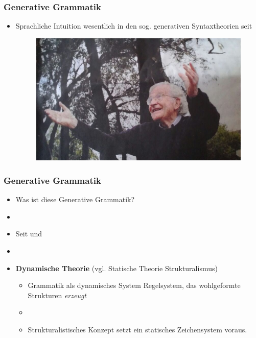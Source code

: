 \begin{frame}
\frametitle{Generative Grammatik}

\begin{itemize}

	\item Sprachliche Intuition \ras wesentlich in den sog. generativen Syntaxtheorien seit \citet{Chomsky57x}

\begin{figure}
\centering
	\includegraphics[scale=.3]{material/04chomsky}
\end{figure}

	
\end{itemize}

\end{frame}


\begin{frame}
\frametitle{Generative Grammatik}

\begin{itemize}
	\item Was ist diese Generative Grammatik? \citep[vgl.][]{Fries&MyP16c}
	\item[]
	\item Seit \citet{Chomsky57x} und \citet{Chomsky65a}
	\item[]
	\item \textbf{Dynamische Theorie} (vgl. Statische Theorie \ras \zB Strukturalismus)
	\begin{itemize}
		\item Grammatik als dynamisches System \ras Regelsystem, das wohlgeformte Strukturen \emph{erzeugt}
		\item[]
		\item Strukturalistisches Konzept  setzt ein statisches Zeichensystem voraus. 
	\end{itemize}

\end{itemize}

\end{frame}


